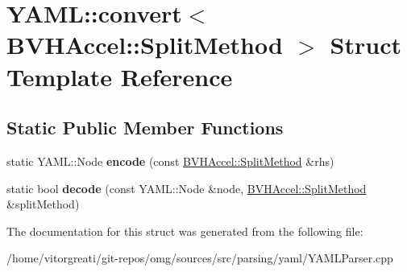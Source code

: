 \hypertarget{struct_y_a_m_l_1_1convert_3_01_b_v_h_accel_1_1_split_method_01_4}{}\section{Y\+A\+ML\+::convert$<$ B\+V\+H\+Accel\+::Split\+Method $>$ Struct Template Reference}
\label{struct_y_a_m_l_1_1convert_3_01_b_v_h_accel_1_1_split_method_01_4}
\subsection*{Static Public Member Functions}
\begin{DoxyCompactItemize}
\item 
\mbox{\label{struct_y_a_m_l_1_1convert_3_01_b_v_h_accel_1_1_split_method_01_4_ab9ce8b0f3d627bdb26e6470b40cf84ff}} 
static Y\+A\+M\+L\+::\+Node {\bfseries encode} (const \mbox{\hyperlink{classomg_1_1_b_v_h_accel_a76a87ca6ffce37773ad59bc4d540c33f}{B\+V\+H\+Accel\+::\+Split\+Method}} \&rhs)
\item 
\mbox{\label{struct_y_a_m_l_1_1convert_3_01_b_v_h_accel_1_1_split_method_01_4_a4efd8a0cf6b1b766c46ab91962804d21}} 
static bool {\bfseries decode} (const Y\+A\+M\+L\+::\+Node \&node, \mbox{\hyperlink{classomg_1_1_b_v_h_accel_a76a87ca6ffce37773ad59bc4d540c33f}{B\+V\+H\+Accel\+::\+Split\+Method}} \&split\+Method)
\end{DoxyCompactItemize}


The documentation for this struct was generated from the following file\+:\begin{DoxyCompactItemize}
\item 
/home/vitorgreati/git-\/repos/omg/sources/src/parsing/yaml/Y\+A\+M\+L\+Parser.\+cpp\end{DoxyCompactItemize}
